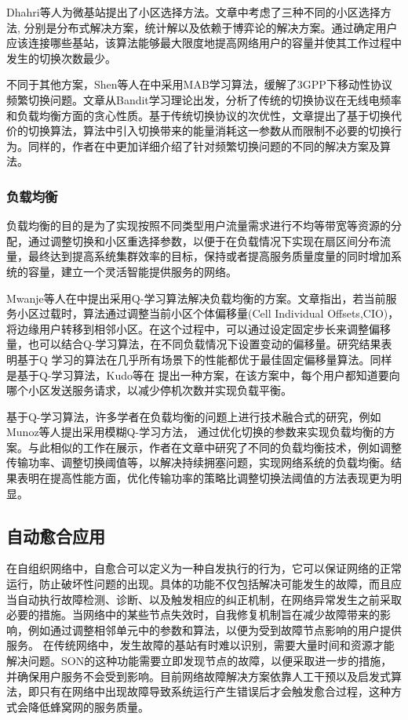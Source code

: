 \documentclass{IEEEtran}
\begin{document}
Dhahri等人\cite{Dhahri2014}为微基站提出了小区选择方法。文章中考虑了三种不同的小区选择方法, 分别是分布式解决方案，统计解以及依赖于博弈论的解决方案。通过确定用户应该连接哪些基站，该算法能够最大限度地提高网络用户的容量并使其工作过程中发生的切换次数最少。

不同于其他方案，Shen等人在\cite{Shen2017}中采用MAB学习算法，缓解了3GPP下移动性协议频繁切换问题。文章从Bandit学习理论出发，分析了传统的切换协议在无线电频率和负载均衡方面的贪心性质。基于传统切换协议的次优性，文章提出了基于切换代价的切换算法，算法中引入切换带来的能量消耗这一参数从而限制不必要的切换行为。同样的，作者在\cite{Shen2016}中更加详细介绍了针对频繁切换问题的不同的解决方案及算法。



\subsubsection{负载均衡}

负载均衡的目的是为了实现按照不同类型用户流量需求进行不均等带宽等资源的分配，通过调整切换和小区重选择参数，以便于在负载情况下实现在扇区间分布流量，最终达到提高系统集群效率的目标，保持或者提高服务质量度量的同时增加系统的容量，建立一个灵活智能提供服务的网络。


Mwanje等人在\cite{Mwanje2013}中提出采用Q-学习算法解决负载均衡的方案。文章指出，若当前服务小区过载时，算法通过调整当前小区个体偏移量(Cell Individual Offsets,CIO)，将边缘用户转移到相邻小区。在这个过程中，可以通过设定固定步长来调整偏移量，也可以结合Q-学习算法，在不同负载情况下设置变动的偏移量。研究结果表明基于Q 学习的算法在几乎所有场景下的性能都优于最佳固定偏移量算法。同样是基于Q-学习算法，Kudo等在\cite{Kudo2014} 提出一种方案，在该方案中，每个用户都知道要向哪个小区发送服务请求，以减少停机次数并实现负载平衡。

基于Q-学习算法，许多学者在负载均衡的问题上进行技术融合式的研究，例如Munoz等人\cite{Munoz2011}提出采用模糊Q-学习方法， 通过优化切换的参数来实现负载均衡的方案。与此相似的工作在\cite{Munoz2013}展示，作者在文章中研究了不同的负载均衡技术，例如调整传输功率、调整切换阈值等，以解决持续拥塞问题，实现网络系统的负载均衡。结果表明在提高性能方面，优化传输功率的策略比调整切换法阈值的方法表现更为明显。


\subsection{自动愈合应用}

在自组织网络中，自愈合可以定义为一种自发执行的行为，它可以保证网络的正常运行，防止破坏性问题的出现。具体的功能不仅包括解决可能发生的故障，而且应当自动执行故障检测、诊断、以及触发相应的纠正机制，在网络异常发生之前采取必要的措施。当网络中的某些节点失效时，自我修复机制旨在减少故障带来的影响，例如通过调整相邻单元中的参数和算法，以便为受到故障节点影响的用户提供服务。 在传统网络中，发生故障的基站有时难以识别，需要大量时间和资源才能解决问题。SON的这种功能需要立即发现节点的故障，以便采取进一步的措施，并确保用户服务不会受到影响。目前网络故障解决方案依靠人工干预以及启发式算法，即只有在网络中出现故障导致系统运行产生错误后才会触发愈合过程，这种方式会降低蜂窝网的服务质量。
\end{document}
